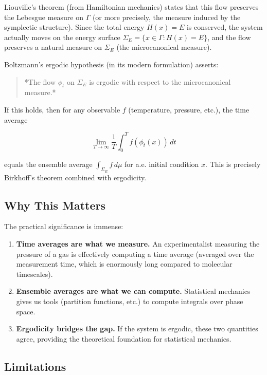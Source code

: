 Liouville's theorem (from Hamiltonian mechanics) states that this flow preserves the Lebesgue measure on $\Gamma$ (or more precisely, the measure induced by the symplectic structure). Since the total energy $H(x) = E$ is conserved, the system actually moves on the energy surface $\Sigma_E = \{x \in \Gamma : H(x) = E\}$, and the flow preserves a natural measure on $\Sigma_E$ (the microcanonical measure).

Boltzmann's ergodic hypothesis (in its modern formulation) asserts:

\begin{quote}
*The flow $\phi_t$ on $\Sigma_E$ is ergodic with respect to the microcanonical measure.*
\end{quote}

If this holds, then for any observable $f$ (temperature, pressure, etc.), the time average

\[
\lim_{T \to \infty} \frac{1}{T} \int_0^T f(\phi_t(x)) \, dt
\]

equals the ensemble average $\int_{\Sigma_E} f \, d\mu$ for a.e. initial condition $x$. This is precisely Birkhoff's theorem combined with ergodicity.

\subsection{Why This Matters}\label{sec:9.9.2}

The practical significance is immense:

\begin{enumerate}[nosep]
  \item \textbf{Time averages are what we measure.} An experimentalist measuring the pressure of a gas is effectively computing a time average (averaged over the measurement time, which is enormously long compared to molecular timescales).

  \item \textbf{Ensemble averages are what we can compute.} Statistical mechanics gives us tools (partition functions, etc.) to compute integrals over phase space.

  \item \textbf{Ergodicity bridges the gap.} If the system is ergodic, these two quantities agree, providing the theoretical foundation for statistical mechanics.
\end{enumerate}

\subsection{Limitations}\label{sec:9.9.3}

